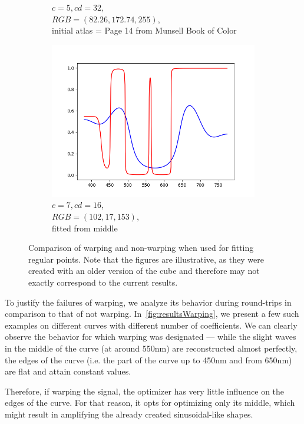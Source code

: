 \begin{figure}[t]
\begin{subfigure}[t]{0.31\textwidth}
		\caption{$c=5, cd=32$,\\$RGB=(82.26, 172.74, 255)$,\\initial atlas = Page 14 from Munsell Book of Color}
		\label{fig:warping_regularPoints_m5_cd32}
	\end{subfigure}
	\begin{subfigure}[t]{0.31\textwidth}
		\includegraphics[width=\linewidth]{img/resultsTechniqueOpt_m7_cd16.png}
		\caption{$c=7, cd=16$,\\$RGB=(102, 17, 153)$,\\ fitted from middle}
		\label{fig:warping_regularPoints_m7_cd16}
	\end{subfigure} 
	\caption{Comparison of warping and non-warping when used for fitting regular points. Note that the figures are illustrative, as they were created with an older version of the cube and therefore may not exactly correspond to the current results.}
	\label{fig:warping_regularPoints}
\end{figure}

To justify the failures of warping, we analyze its behavior during round-trips in comparison to that of not warping. In~\cref{fig:resultsWarping}, we present a few such examples on different curves with different number of coefficients. We can clearly observe the behavior for which warping was designated --- while the slight waves in the middle of the curve (at around 550nm) are reconstructed almost perfectly, the edges of the curve (i.e. the part of the curve up to 450nm and from 650nm) are flat and attain constant values.

Therefore, if warping the signal, the optimizer has very little influence on the edges of the curve. For that reason, it opts for optimizing only its middle, which might result in amplifying the already created sinusoidal-like shapes.

